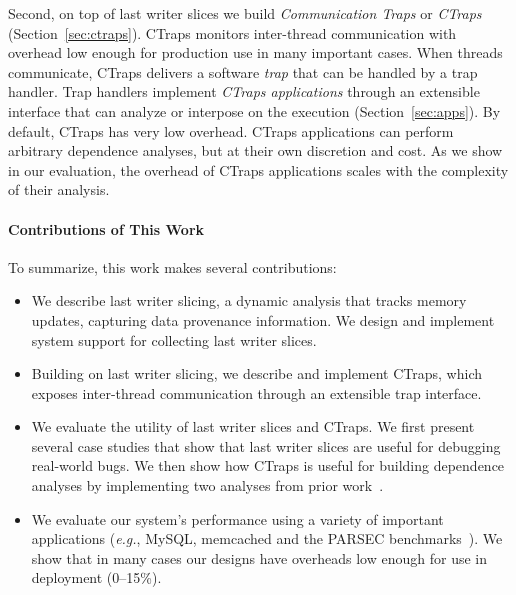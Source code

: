\documentclass[preprint,9pt]{sigplanconf}
\newcommand{\ctraps}{CTraps\xspace}
\begin{document}
Second, on top of last writer slices we build {\em Communication Traps} or {\em
\ctraps}  (Section~\ref{sec:ctraps}).  \ctraps monitors inter-thread
communication with overhead low enough for production use in many important
cases.  When threads communicate, \ctraps delivers a software {\em trap} that
can be handled by a trap handler.  Trap handlers implement {\em \ctraps
applications} through an extensible interface that can analyze or interpose on
the execution (Section~\ref{sec:apps}).  By default, \ctraps has very low
overhead.  \ctraps applications can perform arbitrary dependence analyses, but
at their own discretion and cost.  As we show in our evaluation, the overhead
of \ctraps applications scales with the complexity of their analysis.

\paragraph{Contributions of This Work}
To summarize, this work makes several contributions:
\begin{itemize}

\item{We describe last writer slicing, a dynamic analysis that tracks
memory updates, capturing data provenance information.  We
design and implement system support for collecting last writer slices.  }

\item{Building on last writer slicing, we describe and implement \ctraps, which
exposes inter-thread communication through an extensible trap interface.  }

\item{We evaluate the utility of last writer slices and \ctraps. We first
present several case studies that show that last writer slices are useful for
debugging real-world bugs.  We then show how \ctraps is useful for building
dependence analyses by implementing two analyses from prior
work~\cite{cci,defuse,recon}. }

\item{We evaluate our system's performance using a variety of important
applications ({\em e.g.}, MySQL, memcached and the PARSEC
benchmarks~\cite{parsec}).  We show that in many cases our designs have
overheads low enough for use in deployment (0--15\%).}

\end{itemize}
\end{document}
